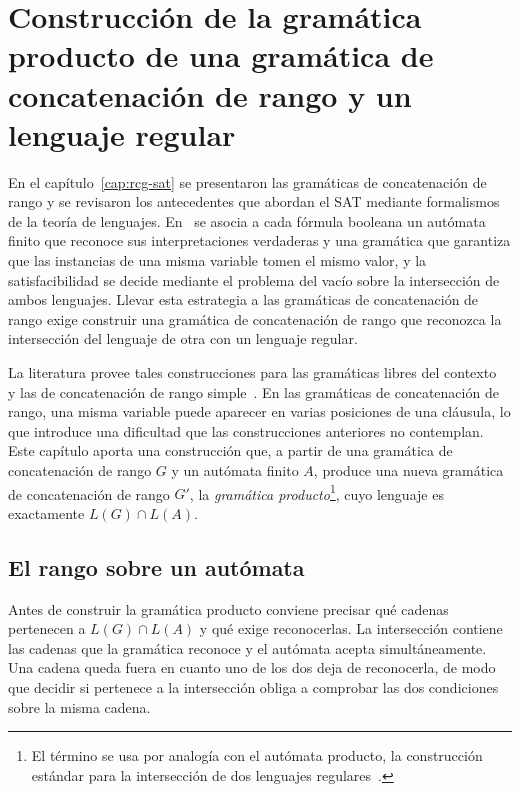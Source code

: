 \documentclass{report}
\theoremstyle{definition}
\theoremstyle{plain}
\theoremstyle{remark}
\begin{document}
\setcounter{chapter}{2}
\chapter{Construcción de la gramática producto de una gramática de concatenación de rango y un lenguaje regular}
\label{cap:interseccion}

En el capítulo~\ref{cap:rcg-sat} se presentaron las gramáticas de
concatenación de rango y se revisaron los antecedentes que abordan el
SAT mediante formalismos de la teoría de lenguajes.
En~\cite{fernandezarias2007, aguileralopez2016} se asocia a cada
fórmula booleana un autómata finito que reconoce sus interpretaciones
verdaderas y una gramática que garantiza que las instancias de una
misma variable tomen el mismo valor, y la satisfacibilidad se decide
mediante el problema del vacío sobre la intersección de ambos
lenguajes. Llevar esta estrategia a las gramáticas de concatenación de
rango exige construir una gramática de concatenación de rango que
reconozca la intersección del lenguaje de otra con un lenguaje
regular.

La literatura provee tales construcciones para las
gramáticas libres del contexto~\cite{barhillel1961} y las de
concatenación de rango simple~\cite{bertsch2001rcg}. En las gramáticas
de concatenación de rango, una misma variable puede aparecer en varias
posiciones de una cláusula, lo que introduce una dificultad que las
construcciones anteriores no contemplan. Este capítulo aporta una
construcción que, a partir de una gramática de concatenación de rango
$G$ y un autómata finito $A$, produce una nueva gramática de
concatenación de rango $G'$, la \emph{gramática
producto}\footnote{El término se usa por analogía con el autómata
producto, la construcción estándar para la intersección de dos
lenguajes regulares~\cite{hopcroft2006introduction}.},
cuyo lenguaje es exactamente $L(G) \cap L(A)$.

\section{El rango sobre un autómata}

Antes de construir la gramática producto conviene precisar qué
cadenas pertenecen a $L(G) \cap L(A)$ y qué exige reconocerlas. La
intersección contiene las cadenas que la gramática reconoce y el
autómata acepta simultáneamente. Una cadena
queda fuera en cuanto uno de los dos deja de reconocerla, de modo que
decidir si pertenece a la intersección obliga a comprobar las dos
condiciones sobre la misma cadena.
\end{document}
